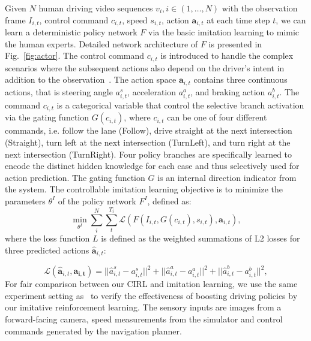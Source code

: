 \documentclass[runningheads]{llncs}
\begin{document}
Given $N$ human driving video sequences $v_i, i\in (1,\dots, N)$ with the observation frame $I_{i,t}$, control command $c_{i,t}$, speed $s_{i,t}$, action $\mathbf{a}_{i,t}$ at each time step $t$, we can learn a deterministic policy network $F$ via the basic imitation learning to mimic the human experts. Detailed network architecture of $F$ is presented in Fig.~\ref{fig:actor}. The control command $c_{i,t}$ is introduced to handle the complex scenarios where the subsequent actions also depend on the driver's intent in addition to the observation~\cite{codevilla2017end}. The
action space $\mathbf{a}_{i,t}$ contains three continuous actions, that is steering angle $a^s_{i,t}$, acceleration $a^a_{i,t}$, and braking action $a^b_{i,t}$. The command $c_{i,t}$ is a categorical variable that control the selective branch activation via the gating function $G(c_{i,t})$, where $c_{i,t}$ can be one of four different commands, i.e. follow the lane (Follow), drive straight at the next intersection (Straight), turn left at the next intersection (TurnLeft), and turn right at the next intersection (TurnRight). Four policy branches are specifically learned to encode the distinct hidden knowledge for each case and thus selectively used for action prediction. 
The gating function $G$ is an internal direction indicator from the system. The controllable imitation learning objective is to minimize the parameters $\theta^I$ of the policy network $F^I$, defined as:
\begin{equation}
\min_{\theta^I} \sum_i^N\sum_t^{T_i}\mathcal{L}(F(I_{i,t},G(c_{i,t}), s_{i,t}), \mathbf{a}_{i,t}),
\label{eq:imitation}
\end{equation}
where the loss function $L$ is defined as the weighted summations of L2 losses for three predicted actions $\mathbf{\hat{a}}_{i,t}$:

\begin{equation}
\mathcal{L}(\mathbf{\hat{a}}_{i,t}, \mathbf{a_{i,t}}) = ||\hat{a}^s_{i,t}-a^s_{i,t}||^2 + ||\hat{a}^a_{i,t}-a^a_{i,t}||^2 + ||\hat{a}^b_{i,t}-a^b_{i,t}||^2,
\end{equation}
For fair comparison between our CIRL and imitation learning, we use the same  experiment setting as~\cite{dosovitskiy2017carla} to verify the effectiveness of boosting driving policies by our imitative reinforcement learning. The sensory inputs are images from a forward-facing camera, speed measurements from the simulator and control commands generated by the navigation planner.
\end{document}
